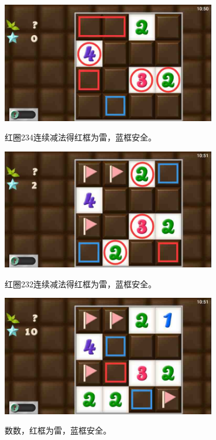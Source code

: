 \subsection{} %
\begin{center}
    \includegraphics[width=0.7\textwidth]{puzzlelow/122-1.jpg}
\end{center}
红圈234连续减法得红框为雷，蓝框安全。
\begin{center}
    \includegraphics[width=0.7\textwidth]{puzzlelow/122-2.jpg}
\end{center}
红圈232连续减法得红框为雷，蓝框安全。
\begin{center}
    \includegraphics[width=0.7\textwidth]{puzzlelow/122-3.jpg}
\end{center}
数数，红框为雷，蓝框安全。

